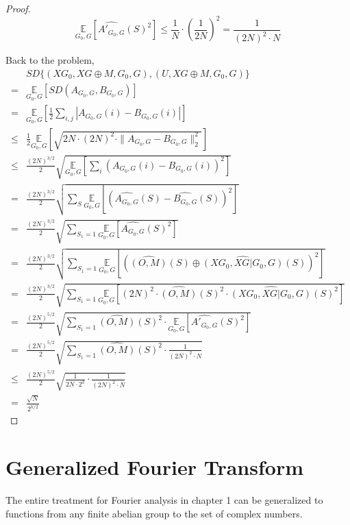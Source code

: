 \begin{proof}
$$\underset{G_0, G} {\mathbb{E}} 
	[\widehat{A'_{G_0,G}}(S)^2] \leq \frac{1}{N} \cdot (\frac{1}{2N})^2 
	= \frac{1}{(2N)^2 \cdot N}$$

Back to the problem,
\begin{align*}
& SD \{ (XG_0, XG \oplus M, G_0, G), (U, XG \oplus M, G_0, G) \} \\
= & \underset{G_0, G} {\mathbb{E}} \left[
	SD (A_{G_0,G},B_{G_0,G}) \right] \\
= & \underset{G_0, G} {\mathbb{E}} \left[
	\frac{1}{2} \sum\limits_{i,j} | A_{G_0,G}(i)- B_{G_0,G} (i)| \right] \\
\leq & \frac{1}{2} \underset{G_0, G} {\mathbb{E}} \left[ \sqrt{
	2N \cdot (2N)^2 \cdot \| A_{G_0,G} - B_{G_0,G} \|_2^2 }  \right] \\	
\leq & \frac{(2N)^{3/2}}{2} \sqrt{ \underset{G_0, G} {\mathbb{E}} \left[ 
	\sum\limits_{i} (A_{G_0,G}(i) - B_{G_0,G}(i) )^2 \right] } \\
= & \frac{(2N)^{3/2}}{2} \sqrt{
	\sum\limits_{S} \underset{G_0, G} {\mathbb{E}} \left[  
		(\widehat{A_{G_0,G}}(S) -
	     \widehat{B_{G_0,G}} (S) )^2 \right] }\\	
= & \frac{(2N)^{3/2}}{2} \sqrt{
	\sum\limits_{S_1 = 1} \underset{G_0, G} {\mathbb{E}} \left[  
		\widehat{A_{G_0,G}}(S)^2 \right] } \\
= & \frac{(2N)^{3/2}}{2} \sqrt{
	\sum\limits_{S_1 = 1} \underset{G_0, G} {\mathbb{E}} \left[  
		(\widehat{(O, M)}(S) \oplus
		\widehat{(XG_0, XG |G_0, G)}(S))^2 \right] } \\		
= & \frac{(2N)^{3/2}}{2} \sqrt{
	\sum\limits_{S_1 = 1} \underset{G_0, G} {\mathbb{E}} \left[  
		(2N)^2 \cdot \widehat{(O, M)}(S)^2 \cdot 
		\widehat{(XG_0, XG |G_0, G)}(S)^2 \right] } \\
=& \frac{(2N)^{5/2}}{2} \sqrt{
	\sum\limits_{S_1 = 1} \widehat{(O, M)}(S)^2 \cdot 
		\underset{G_0, G} {\mathbb{E}} \left[  
		\widehat{A'_{G_0,G}}(S)^2 \right] } \\	
=& \frac{(2N)^{5/2}}{2} \sqrt{
	\sum\limits_{S_1 = 1} \widehat{(O, M)}(S)^2 \cdot 
		\frac{1} {(2N)^2 \cdot N} }	\\
\leq &	\frac{(2N)^{5/2}}{2} \sqrt{
	\frac{1}{2N \cdot 2^k} \cdot 
		\frac{1} {(2N)^2 \cdot N} }\\
= & \frac{\sqrt{N}}{2^{k/2}}						     		                                 
\end{align*}
\end{proof}

\chapter{Generalized Fourier Transform}
The entire treatment for Fourier analysis in chapter 1 can be generalized to functions from any finite abelian group to the set of complex numbers.

